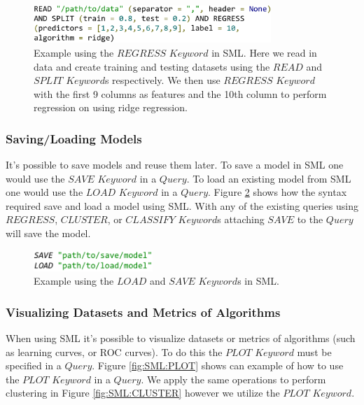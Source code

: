 \documentclass[jair,twoside,11pt,theapa]{article}
\begin{document}
\begin{figure}
\includegraphics[width=0.8\textwidth]{figs/REGRESS.png}
\centering
\caption{Example using the \(REGRESS\) \(Keyword\) in SML. Here we read in data and create training and testing datasets using the \(READ\) and \(SPLIT\) \(Keyword\)s respectively. We then use \(REGRESS\) \(Keyword\) with the first 9 columns as features and the 10th column to perform regression on using ridge regression.}
\label{fig:SML:REGRESS}
\end{figure}

\subsubsection{Saving/Loading Models}
It's possible to save models and reuse them later. To save a model in SML one would use the \(SAVE\) \(Keyword\) in a \(Query\). To load an existing model from SML one would use the \(LOAD\) \(Keyword\) in a \(Query\). Figure \ref{fig:SML:SAVE_LOAD} shows how the syntax required save and load a model using SML. With any of the existing queries using \(REGRESS\), \(CLUSTER\), or \(CLASSIFY\) \(Keyword\)s attaching \(SAVE\) to the \(Query\) will save the model. 

\begin{figure}
\includegraphics[width=0.4\textwidth]{figs/SAVE_LOAD.png}
\centering
\caption{Example using the \(LOAD\) and \(SAVE\) \(Keyword\)s in SML.}
\label{fig:SML:SAVE_LOAD}
\end{figure}

\subsubsection{Visualizing Datasets and Metrics of Algorithms}
When using SML it's possible to visualize datasets or metrics of algorithms (such as learning curves, or ROC curves). To do this the \(PLOT\) \(Keyword\) must be specified in a \(Query\). Figure \ref{fig:SML:PLOT} shows can example of how to use the \(PLOT\) \(Keyword\) in a \(Query\). We apply the same operations to perform clustering in Figure \ref{fig:SML:CLUSTER} however we utilize the \(PLOT\) \(Keyword\).
\end{document}
